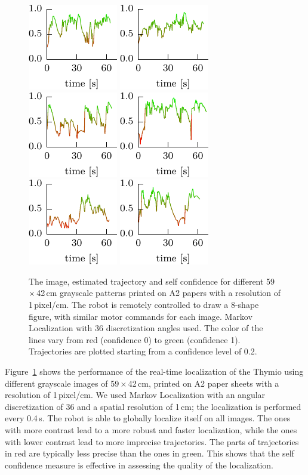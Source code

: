\documentclass[letterpaper, 10pt, conference]{ieeeconf}
\newcommand{\Fig}[1]{Figure~\ref{fig:#1}}
\begin{document}
\begin{figure}
\includegraphics[width=.15\textwidth]{breugel_babel-conf} \hfill
\includegraphics[width=.15\textwidth]{van-gogh_starry-night-conf} \hfill
\includegraphics[width=.15\textwidth]{kandinsky_comp-8-conf} \hfill
\includegraphics[width=.15\textwidth]{vermeer_girl-pearl-conf} \hfill
\includegraphics[width=.15\textwidth]{babar-conf} \hfill
\includegraphics[width=.15\textwidth]{child-drawing_tooth-fairy-conf}

\caption{The image, estimated trajectory and self confidence for different 59\,$\times$\,42\,cm grayscale patterns printed on A2 papers with a resolution of 1\,pixel/cm.
The robot is remotely controlled to draw a 8-shape figure, with similar motor commands for each image.
Markov Localization with 36 discretization angles used.
The color of the lines vary from red (confidence 0) to green (confidence 1).
Trajectories are plotted starting from a confidence level of 0.2.}
\label{fig:a2_drawings}

\end{figure}

\Fig{a2_drawings} shows the performance of the real-time localization of the Thymio using different grayscale images of 59\,$\times$\,42\,cm, printed on A2 paper sheets with a resolution of 1\,pixel/cm.
We used Markov Localization with an angular discretization of 36 and a spatial resolution of 1\,cm; the localization is performed every 0.4\,s.
The robot is able to globally localize itself on all images.
The ones with more contrast lead to a more robust and faster localization, while the ones with lower contrast lead to more imprecise trajectories.
The parts of trajectories in red are typically less precise than the ones in green.
This shows that the self confidence measure is effective in assessing the quality of the localization.
\end{document}
